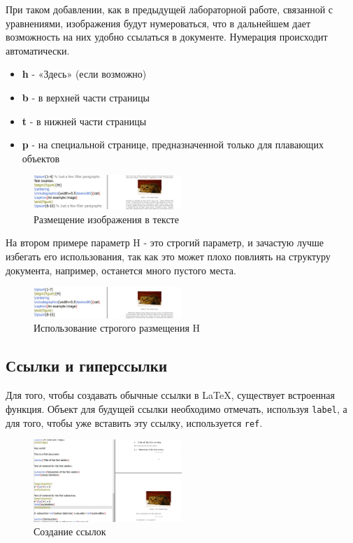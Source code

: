 \documentclass[a4paper,12pt]{article}
\begin{document}
При таком добавлении, как в предыдущей лабораторной работе, связанной с уравнениями, изображения будут нумероваться, что в дальнейшем дает возможность на них удобно ссылаться в документе. Нумерация происходит автоматически.

\begin{itemize}
\item \textbf{h} - «Здесь» (если возможно)
\item \textbf{b} - в верхней части страницы
\item \textbf{t} - в нижней части страницы
\item \textbf{p} - на специальной странице, предназначенной только для плавающих объектов
\end{itemize}

\begin{figure}[h]
\centering
\includegraphics[width=0.5\textwidth]{5.JPG}
\caption{Размещение изображения в тексте}
\label{fig:placement}
\end{figure}

На втором примере параметр H - это строгий параметр, и зачастую лучше избегать его использования, так как это может плохо повлиять на структуру документа, например, останется много пустого места.

\begin{figure}[h]
\centering
\includegraphics[width=0.5\textwidth]{6.JPG}
\caption{Использование строгого размещения H}
\label{fig:strict_placement}
\end{figure}

\subsection{Ссылки и гиперссылки}

Для того, чтобы создавать обычные ссылки в \LaTeX, существует встроенная функция. Объект для будущей ссылки необходимо отмечать, используя \texttt{label}, а для того, чтобы уже вставить эту ссылку, используется \texttt{ref}.

\begin{figure}[h]
\centering
\includegraphics[width=0.5\textwidth]{7.JPG}
\caption{Создание ссылок}
\label{fig:references}
\end{figure}
\end{document}
